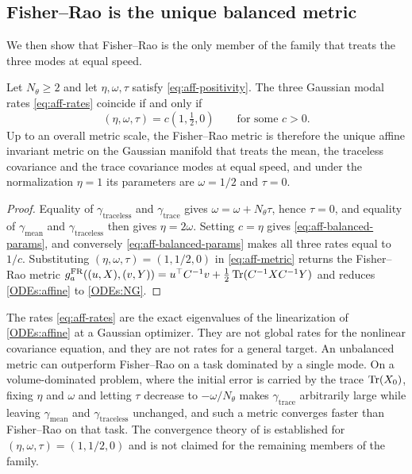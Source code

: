 \subsection{Fisher--Rao is the unique balanced metric}

We then show that Fisher--Rao is the only member of the family that treats the three modes at equal speed.

\begin{theorem}\label{thm:aff-balanced}
    Let $N_\theta \geq 2$ and let $\eta, \omega, \tau$ satisfy \eqref{eq:aff-positivity}. The three Gaussian modal rates \eqref{eq:aff-rates} coincide if and only if
    \begin{equation}\label{eq:aff-balanced-params}
        (\eta, \omega, \tau) = c \left( 1, \tfrac{1}{2}, 0 \right) \qquad \text{for some } c > 0.
    \end{equation}
    Up to an overall metric scale, the Fisher--Rao metric is therefore the unique affine invariant metric on the Gaussian manifold that treats the mean, the traceless covariance and the trace covariance modes at equal speed, and under the normalization $\eta = 1$ its parameters are $\omega = 1/2$ and $\tau = 0$.
\end{theorem}

\begin{proof}
    Equality of $\gamma_{\mathrm{traceless}}$ and $\gamma_{\mathrm{trace}}$ gives $\omega = \omega + N_\theta \tau$, hence $\tau = 0$, and equality of $\gamma_{\mathrm{mean}}$ and $\gamma_{\mathrm{traceless}}$ then gives $\eta = 2\omega$. Setting $c = \eta$ gives \eqref{eq:aff-balanced-params}, and conversely \eqref{eq:aff-balanced-params} makes all three rates equal to $1/c$. Substituting $(\eta, \omega, \tau) = (1, 1/2, 0)$ in \eqref{eq:aff-metric} returns the Fisher--Rao metric $g_a^{\mathrm{FR}}((u,X),(v,Y)) = u^\top C^{-1} v + \frac{1}{2}\operatorname{Tr}(C^{-1}XC^{-1}Y)$ and reduces \eqref{ODEs:affine} to \eqref{ODEs:NG}.
\end{proof}

\begin{remark}\label{rem:aff-scope}
    The rates \eqref{eq:aff-rates} are the exact eigenvalues of the linearization of \eqref{ODEs:affine} at a Gaussian optimizer. They are not global rates for the nonlinear covariance equation, and they are not rates for a general target. An unbalanced metric can outperform Fisher--Rao on a task dominated by a single mode. On a volume-dominated problem, where the initial error is carried by the trace $\operatorname{Tr}(X_0)$, fixing $\eta$ and $\omega$ and letting $\tau$ decrease to $-\omega/N_\theta$ makes $\gamma_{\mathrm{trace}}$ arbitrarily large while leaving $\gamma_{\mathrm{mean}}$ and $\gamma_{\mathrm{traceless}}$ unchanged, and such a metric converges faster than Fisher--Rao on that task. The convergence theory of  is established for $(\eta, \omega, \tau) = (1, 1/2, 0)$ and is not claimed for the remaining members of the family.
\end{remark}

